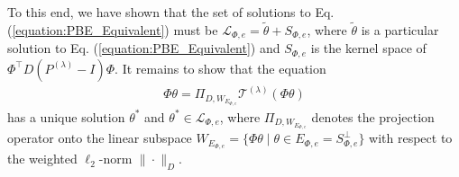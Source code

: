 \documentclass[11 pt]{article}
\begin{document}
	To this end, we have shown that the set of solutions to Eq. (\ref{equation:PBE_Equivalent}) must be $\mathcal{L}_{\Phi,e}=\tilde{\theta}+S_{\Phi,e}$, where $\tilde{\theta}$ is a particular solution to Eq. (\ref{equation:PBE_Equivalent}) and $S_{\Phi,e}$ is the kernel space of $\Phi^\top D(P^{(\lambda)}-I)\Phi$. It remains to show that the equation
	\begin{align}\label{equation:PBE_second}
		\Phi \theta = \Pi_{D,W_{E_{\Phi, e}}} \mathcal{T}^{(\lambda)} \left(\Phi \theta\right)
	\end{align}
	has a unique solution $\theta^*$ and $\theta^*\in\mathcal{L}_{\Phi,e}$,
	where $\Pi_{D,W_{E_{\Phi, e}}}$ denotes the projection operator onto the linear subspace $W_{E_{\Phi, e}}=\{\Phi\theta \mid \theta\in E_{\Phi,e}=S_{\Phi,e}^\perp\}$ with respect to the weighted $\ell_2$-norm $\|\cdot\|_D$. 
\end{document}
